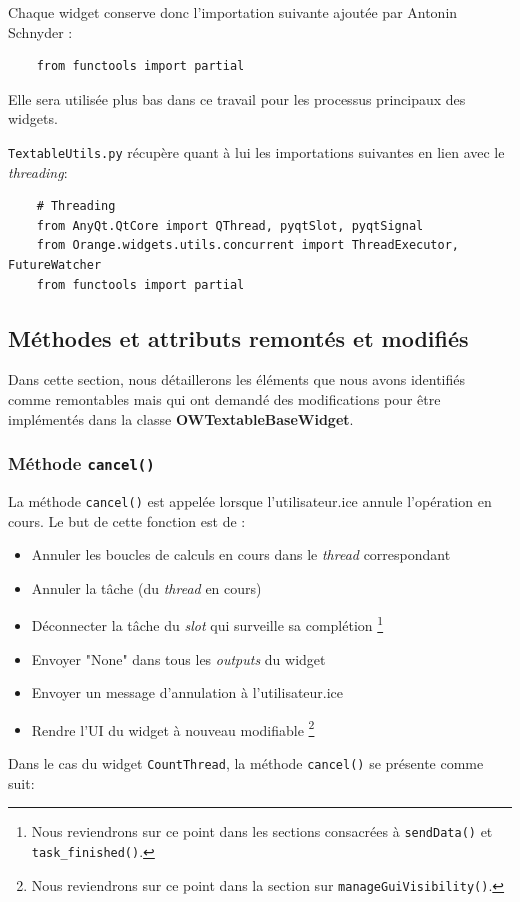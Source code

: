 \documentclass{article}
\begin{document}
Chaque widget conserve donc l'importation suivante ajoutée par Antonin Schnyder : 

\begin{verbatim}
    from functools import partial
\end{verbatim}

Elle sera utilisée plus bas dans ce travail pour les processus principaux des widgets.

\texttt{TextableUtils.py} récupère quant à lui les importations suivantes en lien avec le \textit{threading}:

\begin{verbatim}
    # Threading
    from AnyQt.QtCore import QThread, pyqtSlot, pyqtSignal
    from Orange.widgets.utils.concurrent import ThreadExecutor, FutureWatcher
    from functools import partial
\end{verbatim}



\subsection{Méthodes et attributs remontés et modifiés}

Dans cette section, nous détaillerons les éléments que nous avons identifiés comme remontables mais qui ont demandé des modifications pour être implémentés dans la classe \textbf{OWTextableBaseWidget}.

\subsubsection{Méthode \texttt{cancel()}}

La méthode \texttt{cancel()} est appelée lorsque l'utilisateur.ice annule l'opération en cours. Le but de cette fonction est de :
\vspace{5mm}
\begin{itemize}
    \item Annuler les boucles de calculs en cours dans le \textit{thread} correspondant
    \item Annuler la tâche (du \textit{thread} en cours)
    \item Déconnecter la tâche du \textit{slot} qui surveille sa complétion \footnote{Nous reviendrons sur ce point dans les sections consacrées à \texttt{sendData()} et \texttt{task\_finished()}.}
    \item Envoyer "None" dans tous les \textit{outputs} du widget
    \item Envoyer un message d'annulation à l'utilisateur.ice
    \item Rendre l'UI du widget à nouveau modifiable \footnote{Nous reviendrons sur ce point dans la section sur \texttt{manageGuiVisibility()}.}
\end{itemize}
\vspace{5mm}
Dans le cas du widget \texttt{CountThread}, la méthode \texttt{cancel()} se présente comme suit:
\end{document}
